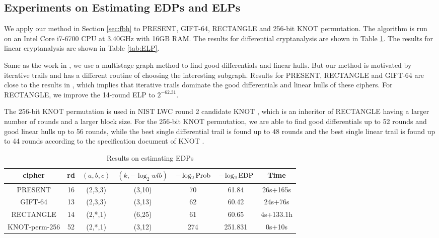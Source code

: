 \subsection{Experiments on Estimating EDPs and ELPs}

We apply our method in Section \ref{sec:fbh} to PRESENT, GIFT-64, RECTANGLE and 256-bit KNOT permutation. The algorithm is run on an Intel Core i7-6700 CPU at 3.40GHz with 16GB RAM. The results for differential cryptanalysis are shown in Table \ref{tab:EDP}. The results for linear cryptanalysis are shown in Table \ref{tab:ELP}. 

Same as the work in \cite{HV18}, we use a multistage graph method to find good differentials and linear hulls. But our method is motivated by iterative trails and has a different routine of choosing the interesting subgraph. Results for PRESENT, RECTANGLE and GIFT-64 are close to the results in \cite{HV18}, which implies that iterative trails dominate the good differentials and linear hulls of these ciphers. For RECTANGLE, we improve the 14-round ELP to $2^{-62.31}$. 

The 256-bit KNOT permutation is used in NIST LWC round 2 candidate KNOT \cite{ZDY19}, which is an inheritor of RECTANGLE having a larger number of rounds and a larger block size. For the 256-bit KNOT permutation, we are able to find good differentials up to 52 rounds and good linear hulls up to 56 rounds, while the best single differential trail is found up to 48 rounds and the best single linear trail is found up to 44 rounds according to the specification document of KNOT \cite{ZDY19}. 

\begin{table}
	\caption{Results on estimating EDPs}\label{tab:EDP}
	\centering
	\begin{tabular}{|c|c|c|c|c|c|c|}
		\hline
		cipher & rd & $(a,b,c)$ & $(k,-\log_2wlb)$ & $-\log_2\text{Prob}$ & $-\log_2\text{EDP}$ & Time \\
		\hline
		PRESENT & 16 & (2,3,3) & (3,10) & 70 & 61.84 & 26s+165s\\
		\hline
		GIFT-64 & 13 & (2,3,3) & (3,13) & 62 & 60.42 & 24s+76s\\
		\hline 
		RECTANGLE & 14 & (2,*,1) & (6,25) & 61 & 60.65 & 4s+133.1h \\
		\hline
		KNOT-perm-256 & 52 & (2,*,1) & (3,12) & 274 & 251.831 & 0s+10s\\
		\hline
	\end{tabular}
\end{table}

